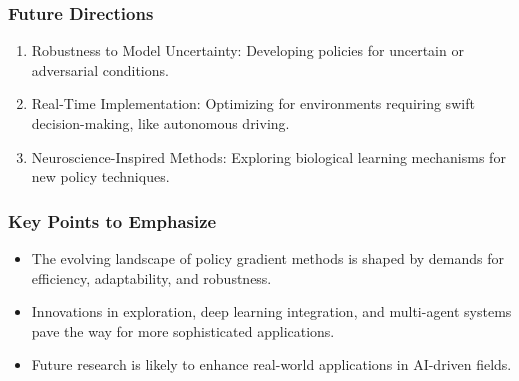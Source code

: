 \documentclass{beamer}
\begin{document}
\begin{frame}[fragile]
    \frametitle{Future Directions}
    \begin{enumerate}
        \item Robustness to Model Uncertainty: Developing policies for uncertain or adversarial conditions.
        \item Real-Time Implementation: Optimizing for environments requiring swift decision-making, like autonomous driving.
        \item Neuroscience-Inspired Methods: Exploring biological learning mechanisms for new policy techniques.
    \end{enumerate}
\end{frame}

\begin{frame}[fragile]
    \frametitle{Key Points to Emphasize}
    \begin{itemize}
        \item The evolving landscape of policy gradient methods is shaped by demands for efficiency, adaptability, and robustness.
        \item Innovations in exploration, deep learning integration, and multi-agent systems pave the way for more sophisticated applications.
        \item Future research is likely to enhance real-world applications in AI-driven fields.
    \end{itemize}
\end{frame}
\end{document}
